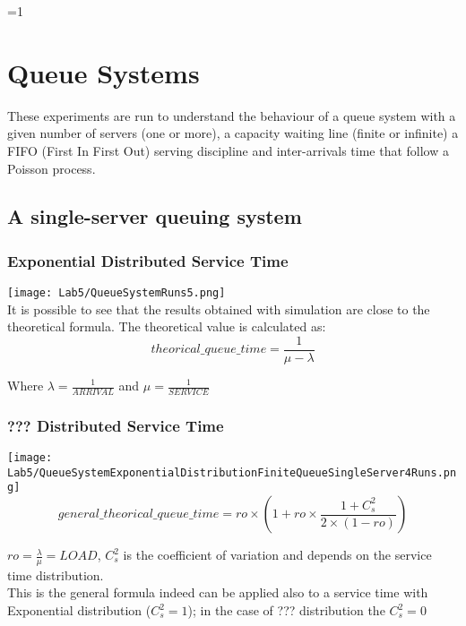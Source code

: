 \documentclass{report}
\newcounter{debug}
\begin{document}
\ifnum\value{debug}=1 {
    
\chapter{Queue Systems}
	These experiments are run to understand the behaviour of a queue system with a given number of servers (one or more), a capacity waiting line (finite or infinite) a FIFO (First In First Out) serving discipline and inter-arrivals time that follow a Poisson process.
	
	 \section{A single-server queuing system}
	 			\subsection{Exponential Distributed Service Time}
	 						\texttt{[image: Lab5/QueueSystemRuns5.png]} \\
								It is possible to see that the results obtained with simulation are close to the theoretical formula. 
			The theoretical value is calculated as:
			\begin{equation}
				theorical\_queue\_time = \frac{1}{ \mu - \lambda} 
			\end{equation}
			\begin{center}
				Where $\lambda=\frac{1}{ARRIVAL}$ and $\mu=\frac{1}{SERVICE}$
			\end{center}
			
	 			\subsection{??? Distributed Service Time}
	 			\texttt{[image: Lab5/QueueSystemExponentialDistributionFiniteQueueSingleServer4Runs.png]} \\
	 			\begin{equation}
						general\_theorical\_queue\_time = ro \times ( 1 + ro \times \frac{1+C_s^2}{2\times(1-ro)} )
				\end{equation}
				\begin{center}
						$ro=\frac{\lambda}{\mu}=LOAD$, $C_s^2$ is the coefficient of variation and depends on the service time distribution. \\
						This is the general formula indeed can be applied also to a service time with Exponential distribution ($C_s^2=1$); in the case of ??? distribution the $C_s^2=0$
				\end{center}
} \fi
\end{document}
